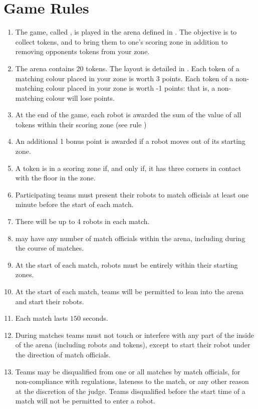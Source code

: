 \section{Game Rules}
\label{sec:rules}

\begin{enumerate}
  \item The game, called \emph{\gamename}, is played in the arena defined in
        . The objective is to collect tokens, and to bring
        them to one's scoring zone in addition to removing opponents tokens from
        your zone.
  \item The arena contains 20 tokens. The layout is detailed in
        . Each token of a matching colour placed in your
        zone is worth 3 points. Each token of a non-matching colour placed in
        your zone is worth -1 points: that is, a non-matching colour will lose
        points.
  \item At the end of the game, each robot is awarded the sum of the value of
        all tokens within their scoring zone (see rule )
  \item An additional 1 bonus point is awarded if a robot moves out of its
        starting zone.
  \item \label{rules:token}A token is in a scoring zone if, and only if, it
        has three corners in contact with the floor in the zone.
  \item Participating teams must present their robots to match officials at
        least one minute before the start of each match.
  \item There will be up to 4 robots in each match.
  \item \org may have any number of match officials within the arena, including
        during the course of matches.
  \item At the start of each match, robots must be entirely within their
        starting zones.
  \item At the start of each match, teams will be permitted to lean into the
        arena and start their robots.
  \item Each match lasts $150$ seconds.
  \item During matches teams must not touch or interfere with any part of the
        inside of the arena (including robots and tokens), except to start their
        robot under the direction of match officials.
  \item Teams may be disqualified from one or all matches by match officials,
        for non-compliance with regulations, lateness to the match, or any other
        reason at the discretion of the judge. Teams disqualified before the
        start time of a match will not be permitted to enter a robot.
\end{enumerate}
